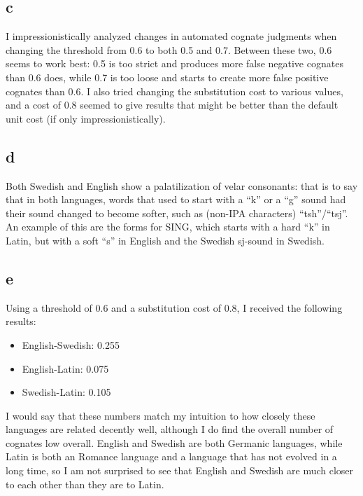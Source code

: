 \documentclass{article}
\begin{document}
\subsection{c}
I impressionistically analyzed changes in automated cognate judgments when changing the threshold from 0.6 to both 0.5 and 0.7. Between these two, 0.6 seems to work best: 0.5 is too strict and produces more false negative cognates than 0.6 does, while 0.7 is too loose and starts to create more false positive cognates than 0.6. I also tried changing the substitution cost to various values, and a cost of 0.8 seemed to give results that might be better than the default unit cost (if only impressionistically).

\subsection{d}
Both Swedish and English show a palatilization of velar consonants: that is to say that in both languages, words that used to start with a ``k'' or a ``g'' sound had their sound changed to become softer, such as (non-IPA characters) ``tsh''/``tsj''. An example of this are the forms for SING, which starts with a hard ``k'' in Latin, but with a soft ``s'' in English and the Swedish sj-sound in Swedish.

\subsection{e}
Using a threshold of 0.6 and a substitution cost of 0.8, I received the following results:
\begin{itemize}
    \item English-Swedish: 0.255
    \item English-Latin: 0.075
    \item Swedish-Latin: 0.105
\end{itemize}

I would say that these numbers match my intuition to how closely these languages are related decently well, although I do find the overall number of cognates low overall. English and Swedish are both Germanic languages, while Latin is both an Romance language and a language that has not evolved in a long time, so I am not surprised to see that English and Swedish are much closer to each other than they are to Latin.


\end{document}
